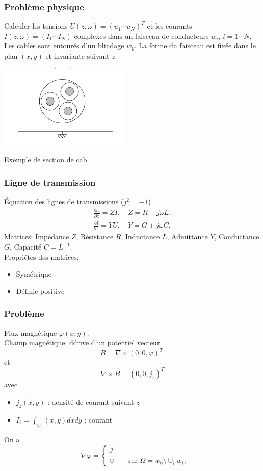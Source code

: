 \begin{frame}
\frametitle{Probl\`eme physique}
Calculer les tensions $U(z,\omega) =(u_1 \cdots u_N)^T$ et les courants $I(z,\omega) = (I_1\cdots I_N)$ complexes dans un faisceau de conducteurs $w_i$, $i=1\cdots N$. Les cables sont entour\'es d'un blindage $w_0$. La forme du faisceau est fix\'ee dans le plan $(x,y)$ et invariante suivant $z$.
\begin{center}
\includegraphics[height=4cm]{figures/f1}
\end{center}
Exemple de section de cab
\end{frame} 


\begin{frame}
\frametitle{Ligne de transmission}
\'Equation des lignes de transmissions ($j^2=-1$)
\begin{eqnarray*}
\frac{\partial U}{\partial z} =ZI, \quad Z=R+j\omega L,\\
\frac{\partial I}{\partial z} =YU, \quad Y=G+j\omega C.
\end{eqnarray*}
Matrices: 
Imp\'edance $Z$, R\'esistance $R$, Inductance $L$, Admittance $Y$, Conductance $G$, Capacit\'e
$C=L^{-1}.$\\[0.4cm]
Propri\'etes des matrices: 
\begin{itemize}
\item Sym\'etrique
\item D\'efinie positive
\end{itemize}

\end{frame} 

\begin{frame}
\frametitle{Probl\`eme}
Flux magn\'etique $\varphi(x,y)$. \\
Champ magn\'etique: d\'drive d'un potentiel vecteur 
$$B=\nabla \times (0,0,\varphi)^T.$$ et
$$\nabla\times B=(0,0,j_z)^T$$ avec
\begin{itemize}
\item  $j_z(x,y)$ : densit\'e de courant suivant $z$
\item  $I_i= \int _{w_i}(x,y)dxdy$ :  courant
\end{itemize}
On a
\begin{equation}
-\nabla\varphi =
\begin{cases}
j_z \\ 
0 \qquad \text{sur } \Omega =w_0 \setminus \cup_i w_i,
\end{cases}
\end{equation} 
\end{frame}

